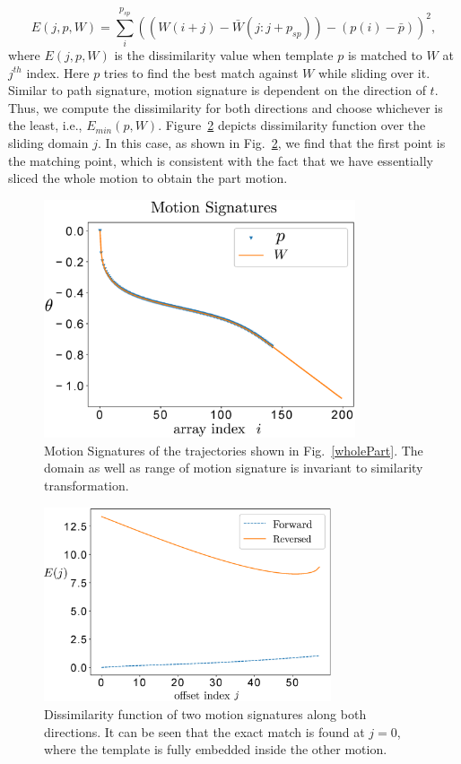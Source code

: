 \begin{equation}\label{mccEq}
  E(j, p, W) = \sum_{i}^{p_{sp}} {((W(i+j) - \bar{W}(j: j + p_{sp})) - (p(i) - \bar{p}))}^2,
\end{equation}
where $E(j, p, W)$ is the dissimilarity value when template $p$ is matched to $W$ at $j^{th}$ index. Here $p$ tries to find the best match against $W$ while sliding over it.
Similar to path signature, motion signature is dependent on the direction of $t$. Thus, we compute the dissimilarity for both directions and choose whichever is the least, i.e., $E_{min}(p, W)$.
Figure~\ref{mcc} depicts dissimilarity function over the sliding domain $j$.
In this case, as shown in Fig.~\ref{mcc}, we find that the first point is the matching point, which is consistent with the fact that we have essentially sliced the whole motion to obtain the part motion.

\begin{figure}
\centering
\includegraphics[width=260pt]{jcise-18/figure/fig_motion_signatures.eps}
  \caption{Motion Signatures of the trajectories shown in Fig.~\ref{wholePart}. The domain as well as range of motion signature is invariant to similarity transformation.}
\label{motionSignature}
\end{figure}

\begin{figure}
\centering
\includegraphics[width=240pt]{jcise-18/figure/fig_mcc.eps}
  \caption{Dissimilarity function of two motion signatures along both directions. It can be seen that the exact match is found at $j=0$, where the template is fully embedded inside the other motion.}
\label{mcc}
\end{figure}


